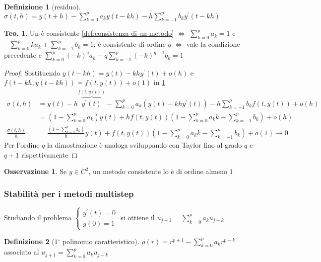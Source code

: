 \documentclass[a4paper,10pt]{article}
\theoremstyle{definition}
\theoremstyle{indentdefinition}
\newtheorem{defn}{Definizione}[section]
\theoremstyle{indenttheorem}
\newtheorem{thm}{Teo.}
\theoremstyle{myremark}
\newtheorem*{rem*}{Osservazione}
\theoremstyle{indentgeneral}
\theoremstyle{plain}
\theoremstyle{plain}
\begin{document}
\begin{defn}[residuo]
\label{def:residuo-di-un-metodo}$\sigma\left(t,h\right)=y\left(t+h\right)-\sum_{k=0}^{p}a_{k}y\left(t-kh\right)-h\sum_{k=-1}^{p}b_{k}y^{\prime}\left(t-kh\right)$
\end{defn}

\begin{thm}
Un  è consistente \eqref{def:consistenza-di-un-metodo}
$\Longleftrightarrow$ $\sum_{k=0}^{p}a_{k}=1$ e $-\sum_{k=0}^{p}ka_{k}+\sum_{k=-1}^{p}b_{k}=1$;
è consistente di ordine $q$ $\Longleftrightarrow$ vale la condizione
precedente e $\sum_{k=0}^{p}\left(-k\right)^{q}a_{k}+q\sum_{k=-1}^{p}\left(-k\right)^{q-1}b_{k}=1$
\end{thm}

\begin{proof}
Sostituendo $y\left(t-kh\right)=y\left(t\right)-khy^{\prime}\left(t\right)+o\left(h\right)$
e $f\left(t-kh,y\left(t-kh\right)\right)=f\left(t,y\left(t\right)\right)+o\left(1\right)$
in \ref{def:residuo-di-un-metodo}
\begin{align*}
\sigma\left(t,h\right) & =y\left(t\right)-h\overset{f\left(t,y\left(t\right)\right)}{\overbrace{y^{\prime}\left(t\right)}}-\sum_{k=0}^{p}a_{k}\left(y\left(t\right)-khy^{\prime}\left(t\right)\right)-h\sum_{k=-1}^{p}b_{k}f\left(t,y\left(t\right)\right)+o\left(h\right)\\
 & =\left(1-\sum_{k=0}^{p}a_{k}\right)y\left(t\right)+hf\left(t,y\left(t\right)\right)\left(1-\sum_{k=0}^{p}a_{k}k-\sum_{k=-1}^{p}b_{k}\right)+o\left(h\right)\\
\frac{\sigma\left(t,h\right)}{h} & =\frac{\left(1-\sum_{k=0}^{p}a_{k}\right)}{h}y\left(t\right)+f\left(t,y\left(t\right)\right)\left(1-\sum_{k=0}^{p}a_{k}k-\sum_{k=-1}^{p}b_{k}\right)+o\left(1\right)\longrightarrow0
\end{align*}
Per l'ordine $q$ la dimostrazione è analoga sviluppando con Taylor
fino al grado $q$ e $q+1$ rispettivamente
\end{proof}
\begin{rem*}
Se $y\in C^{2}$, un metodo consistente lo è di ordine almeno $1$
\end{rem*}

\subsubsection{Stabilità per i metodi multistep}

Studiando il problema $\begin{cases}
y^{\prime}\left(t\right)=0\\
y\left(0\right)=1
\end{cases}$ si ottiene il  $u_{j+1}=\sum_{k=0}^{p}a_{k}u_{j-k}$
\begin{defn}[$1{^\circ}$ polinomio caratteristico]
\label{def:polinomio-caratteristico}$\rho\left(r\right)=r^{p+1}-\sum_{k=0}^{p}a_{k}r^{p-k}$
associato al  $u_{j+1}=\sum_{k=0}^{p}a_{k}u_{j-k}$
\end{defn}
\end{document}
